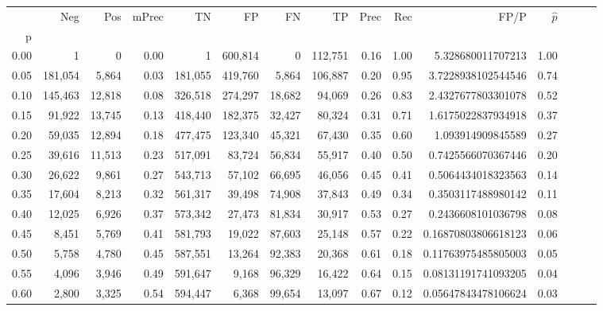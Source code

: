 \begin{tabular}{rrrrrrrrrrrrrrr}
\toprule
{} &      Neg &     Pos & mPrec &       TN &       FP &       FN &       TP &  Prec &   Rec &                    FP/P & $\hat{p}$ \\
p    &          &         &       &          &          &          &          &       &       &                         &           \\
\midrule
0.00 &        1 &       0 &  0.00 &        1 &  600,814 &        0 &  112,751 &  0.16 &  1.00 &       5.328680011707213 &      1.00 \\
0.05 &  181,054 &   5,864 &  0.03 &  181,055 &  419,760 &    5,864 &  106,887 &  0.20 &  0.95 &      3.7228938102544546 &      0.74 \\
0.10 &  145,463 &  12,818 &  0.08 &  326,518 &  274,297 &   18,682 &   94,069 &  0.26 &  0.83 &      2.4327677803301078 &      0.52 \\
0.15 &   91,922 &  13,745 &  0.13 &  418,440 &  182,375 &   32,427 &   80,324 &  0.31 &  0.71 &      1.6175022837934918 &      0.37 \\
0.20 &   59,035 &  12,894 &  0.18 &  477,475 &  123,340 &   45,321 &   67,430 &  0.35 &  0.60 &       1.093914909845589 &      0.27 \\
0.25 &   39,616 &  11,513 &  0.23 &  517,091 &   83,724 &   56,834 &   55,917 &  0.40 &  0.50 &      0.7425566070367446 &      0.20 \\
0.30 &   26,622 &   9,861 &  0.27 &  543,713 &   57,102 &   66,695 &   46,056 &  0.45 &  0.41 &      0.5064434018323563 &      0.14 \\
0.35 &   17,604 &   8,213 &  0.32 &  561,317 &   39,498 &   74,908 &   37,843 &  0.49 &  0.34 &      0.3503117488980142 &      0.11 \\
0.40 &   12,025 &   6,926 &  0.37 &  573,342 &   27,473 &   81,834 &   30,917 &  0.53 &  0.27 &      0.2436608101036798 &      0.08 \\
0.45 &    8,451 &   5,769 &  0.41 &  581,793 &   19,022 &   87,603 &   25,148 &  0.57 &  0.22 &     0.16870803806618123 &      0.06 \\
0.50 &    5,758 &   4,780 &  0.45 &  587,551 &   13,264 &   92,383 &   20,368 &  0.61 &  0.18 &     0.11763975485805003 &      0.05 \\
0.55 &    4,096 &   3,946 &  0.49 &  591,647 &    9,168 &   96,329 &   16,422 &  0.64 &  0.15 &     0.08131191741093205 &      0.04 \\
0.60 &    2,800 &   3,325 &  0.54 &  594,447 &    6,368 &   99,654 &   13,097 &  0.67 &  0.12 &     0.05647843478106624 &      0.03 \\

\end{tabular}
